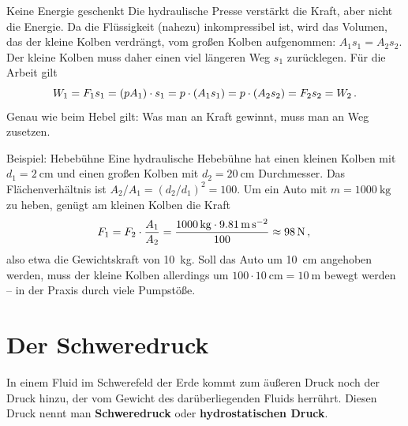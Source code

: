 \begin{importantbox}[]{Keine Energie geschenkt}
    Die hydraulische Presse verstärkt die Kraft, aber nicht die Energie. Da die Flüssigkeit (nahezu) inkompressibel ist, wird das Volumen, das der kleine Kolben verdrängt, vom großen Kolben aufgenommen: $A_1 s_1 = A_2 s_2$. Der kleine Kolben muss daher einen viel längeren Weg $s_1$ zurücklegen. Für die Arbeit gilt
    \begin{equation*}
        W_1 = F_1 s_1 = (p A_1) \cdot s_1 = p \cdot (A_1 s_1) = p \cdot (A_2 s_2) = F_2 s_2 = W_2 \,.
    \end{equation*}
    Genau wie beim Hebel gilt: Was man an Kraft gewinnt, muss man an Weg zusetzen.
\end{importantbox}

\begin{examplebox}[]{Beispiel: Hebebühne}
    Eine hydraulische Hebebühne hat einen kleinen Kolben mit $d_1 = \SI{2}{\centi\meter}$ und einen großen Kolben mit $d_2 = \SI{20}{\centi\meter}$ Durchmesser. Das Flächenverhältnis ist $A_2/A_1 = (d_2/d_1)^2 = 100$. Um ein Auto mit $m = \SI{1000}{\kilo\gram}$ zu heben, genügt am kleinen Kolben die Kraft
    \begin{equation*}
        F_1 = F_2 \cdot \frac{A_1}{A_2} = \frac{\SI{1000}{\kilo\gram} \cdot \SI{9.81}{\meter\per\second\squared}}{100} \approx \SI{98}{\newton} \,{,}\,
    \end{equation*}
    also etwa die Gewichtskraft von \SI{10}{\kilo\gram}. Soll das Auto um \SI{10}{\centi\meter} angehoben werden, muss der kleine Kolben allerdings um $100 \cdot \SI{10}{\centi\meter} = \SI{10}{\meter}$ bewegt werden -- in der Praxis durch viele Pumpstöße.
\end{examplebox}

\section{Der Schweredruck}\label{sec: schweredruck}
In einem Fluid im Schwerefeld der Erde kommt zum äußeren Druck noch der Druck hinzu, der vom Gewicht des darüberliegenden Fluids herrührt. Diesen Druck nennt man \textbf{Schweredruck} oder \textbf{hydrostatischen Druck}.


